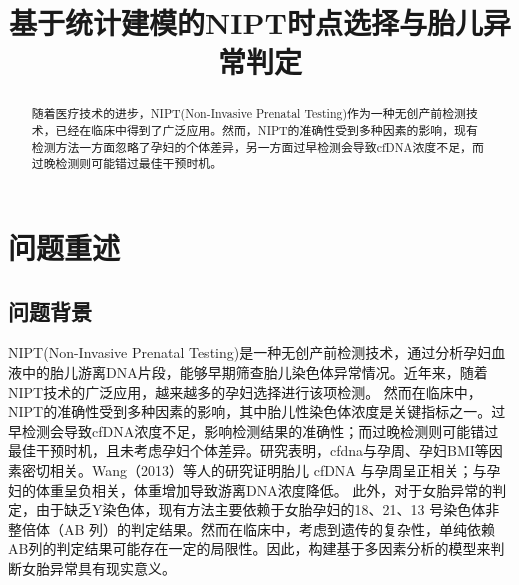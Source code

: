 \documentclass{cumcmthesis}
\title{基于统计建模的NIPT时点选择与胎儿异常判定}
\begin{document}
\maketitle

\begin{abstract}
            随着医疗技术的进步，NIPT(Non-Invasive Prenatal Testing)作为一种无创产前检测技术，已经在临床中得到了广泛应用。然而，NIPT的准确性受到多种因素的影响，现有检测方法一方面忽略了孕妇的个体差异，另一方面过早检测会导致cfDNA浓度不足，而过晚检测则可能错过最佳干预时机。
        \end{abstract}
        \section{问题重述}
        \subsection{问题背景}
        NIPT(Non-Invasive Prenatal Testing)是一种无创产前检测技术，通过分析孕妇血液中的胎儿游离DNA片段，能够早期筛查胎儿染色体异常情况。近年来，随着NIPT技术的广泛应用，越来越多的孕妇选择进行该项检测。
        \newline
        \hspace*{2em} 然而在临床中，NIPT的准确性受到多种因素的影响，其中胎儿性染色体浓度是关键指标之一。过早检测会导致cfDNA浓度不足，影响检测结果的准确性；而过晚检测则可能错过最佳干预时机，且未考虑孕妇个体差异。研究表明，cfdna与孕周、孕妇BMI等因素密切相关。Wang（2013）等人的研究证明胎儿 cfDNA 与孕周呈正相关；与孕妇的体重呈负相关，体重增加导致游离DNA浓度降低。
        \newline
        \hspace*{2em} 此外，对于女胎异常的判定，由于缺乏Y染色体，现有方法主要依赖于女胎孕妇的18、21、13 号染色体非整倍体（AB 列）的判定结果。然而在临床中，考虑到遗传的复杂性，单纯依赖AB列的判定结果可能存在一定的局限性。因此，构建基于多因素分析的模型来判断女胎异常具有现实意义。
\end{document}
